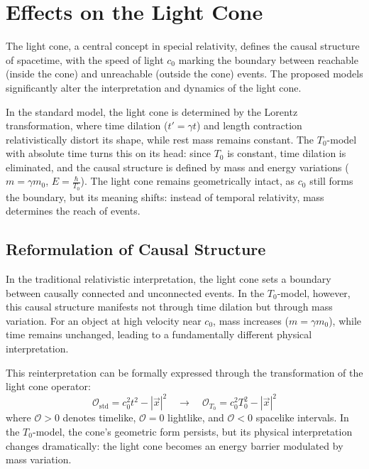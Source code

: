\documentclass[a4paper,12pt]{article}
\begin{document}
	\section{Effects on the Light Cone}
	The light cone, a central concept in special relativity, defines the causal structure of spacetime, with the speed of light \( c_0 \) marking the boundary between reachable (inside the cone) and unreachable (outside the cone) events. The proposed models significantly alter the interpretation and dynamics of the light cone.
	
	In the standard model, the light cone is determined by the Lorentz transformation, where time dilation (\( t' = \gamma t \)) and length contraction relativistically distort its shape, while rest mass remains constant. The \( T_0 \)-model with absolute time turns this on its head: since \( T_0 \) is constant, time dilation is eliminated, and the causal structure is defined by mass and energy variations (\( m = \gamma m_0 \), \( E = \frac{\hbar}{T_0} \)). The light cone remains geometrically intact, as \( c_0 \) still forms the boundary, but its meaning shifts: instead of temporal relativity, mass determines the reach of events.
	
	\subsection{Reformulation of Causal Structure}
	In the traditional relativistic interpretation, the light cone sets a boundary between causally connected and unconnected events. In the \( T_0 \)-model, however, this causal structure manifests not through time dilation but through mass variation. For an object at high velocity near \( c_0 \), mass increases (\( m = \gamma m_0 \)), while time remains unchanged, leading to a fundamentally different physical interpretation.
	
	This reinterpretation can be formally expressed through the transformation of the light cone operator:
	\begin{equation}
		\mathcal{O}_{\text{std}} = c_0^2 t^2 - |\vec{x}|^2 \quad \rightarrow \quad \mathcal{O}_{T_0} = c_0^2 T_0^2 - |\vec{x}|^2
	\end{equation}
	where \( \mathcal{O} > 0 \) denotes timelike, \( \mathcal{O} = 0 \) lightlike, and \( \mathcal{O} < 0 \) spacelike intervals. In the \( T_0 \)-model, the cone's geometric form persists, but its physical interpretation changes dramatically: the light cone becomes an energy barrier modulated by mass variation.
	
\end{document}
